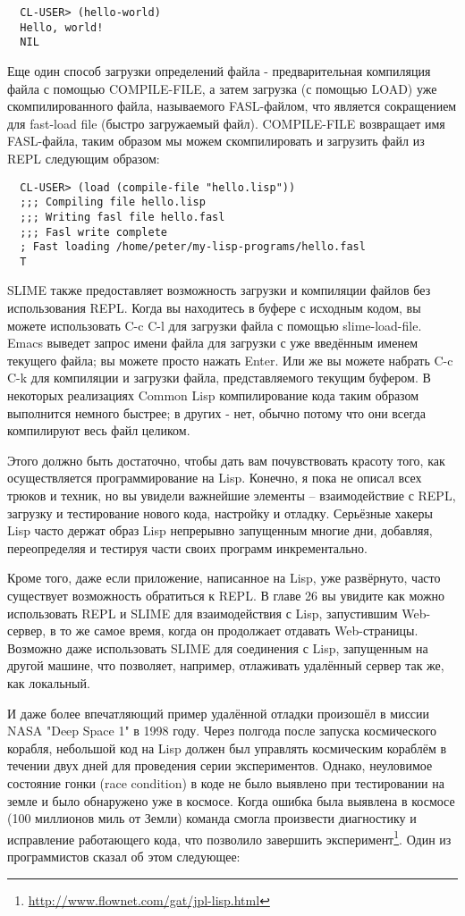 \begin{verbatim}
  CL-USER> (hello-world)
  Hello, world!
  NIL
\end{verbatim}

Еще один способ загрузки определений файла - предварительная компиляция файла с помощью
COMPILE-FILE, а затем загрузка (с помощью LOAD) уже скомпилированного файла, называемого
FASL-файлом, что является сокращением для fast-load file (быстро загружаемый
файл). COMPILE-FILE возвращает имя FASL-файла, таким образом мы можем скомпилировать и
загрузить файл из REPL следующим образом:

\begin{verbatim}
  CL-USER> (load (compile-file "hello.lisp"))
  ;;; Compiling file hello.lisp
  ;;; Writing fasl file hello.fasl
  ;;; Fasl write complete
  ; Fast loading /home/peter/my-lisp-programs/hello.fasl
  T
\end{verbatim}

SLIME также предоставляет возможность загрузки и компиляции файлов без использования
REPL. Когда вы находитесь в буфере с исходным кодом, вы можете использовать C-c C-l для
загрузки файла с помощью slime-load-file. Emacs выведет запрос имени файла для загрузки с
уже введённым именем текущего файла; вы можете просто нажать Enter. Или же вы можете
набрать C-c C-k для компиляции и загрузки файла, представляемого текущим буфером. В
некоторых реализациях Common Lisp компилирование кода таким образом выполнится немного
быстрее; в других - нет, обычно потому что они всегда компилируют весь файл целиком.

Этого должно быть достаточно, чтобы дать вам почувствовать красоту того, как
осуществляется программирование на Lisp. Конечно, я пока не описал всех трюков и техник,
но вы увидели важнейшие элементы -- взаимодействие с REPL, загрузку и тестирование нового
кода, настройку и отладку. Серьёзные хакеры Lisp часто держат образ Lisp непрерывно
запущенным многие дни, добавляя, переопределяя и тестируя части своих программ
инкрементально.

Кроме того, даже если приложение, написанное на Lisp, уже развёрнуто, часто существует
возможность обратиться к REPL. В главе 26 вы увидите как можно использовать REPL и SLIME
для взаимодействия с Lisp, запустившим Web-сервер, в то же самое время, когда он
продолжает отдавать Web-страницы. Возможно даже использовать SLIME для соединения с Lisp,
запущенным на другой машине, что позволяет, например, отлаживать удалённый сервер так же,
как локальный.

И даже более впечатляющий пример удалённой отладки произошёл в миссии NASA "Deep Space 1"
в 1998 году. Через полгода после запуска космического корабля, небольшой код на Lisp
должен был управлять космическим кораблём в течении двух дней для проведения серии
экспериментов. Однако, неуловимое состояние гонки (race condition) в коде не было выявлено
при тестировании на земле и было обнаружено уже в космосе. Когда ошибка была выявлена в
космосе (100 миллионов миль от Земли) команда смогла произвести диагностику и исправление
работающего кода, что позволило завершить
эксперимент\footnote{\url{http://www.flownet.com/gat/jpl-lisp.html}}. Один из
программистов сказал об этом следующее:

